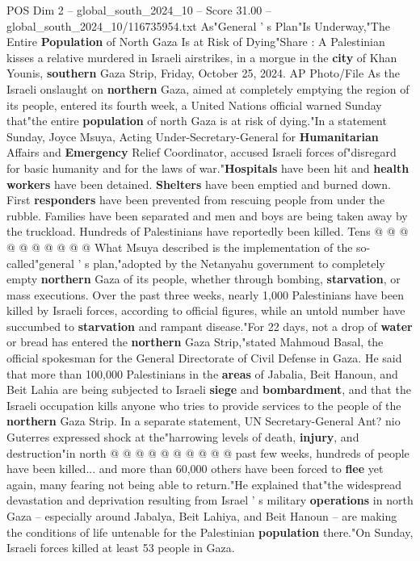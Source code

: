 \begin{textsample}{POS Dim 2 – global\_south\_2024\_10 – Score 31.00 – global\_south\_2024\_10/116735954.txt}  \label{ex:f2_pos_132}
As"General ' s Plan"Is Underway,"The Entire \textbf{Population} of North Gaza Is at Risk of Dying"Share : A Palestinian kisses a relative murdered in Israeli airstrikes, in a morgue in the \textbf{city} of Khan Younis, \textbf{southern} Gaza Strip, Friday, October 25, 2024.
AP Photo/File As the Israeli onslaught on \textbf{northern} Gaza, aimed at completely emptying the region of its people, entered its fourth week, a United Nations official warned Sunday that"the entire \textbf{population} of north Gaza is at risk of dying."In a statement Sunday, Joyce Msuya, Acting Under-Secretary-General for \textbf{Humanitarian} Affairs and \textbf{Emergency} Relief Coordinator, accused Israeli forces of"disregard for basic humanity and for the laws of war."\textbf{Hospitals} have been hit and \textbf{health} \textbf{workers} have been detained. \textbf{Shelters} have been emptied and burned down.
First \textbf{responders} have been prevented from rescuing people from under the rubble.
Families have been separated and men and boys are being taken away by the truckload.
Hundreds of Palestinians have reportedly been killed.
Tens @ @ @ @ @ @ @ @ @ @ What Msuya described is the implementation of the so-called"general ' s plan,"adopted by the Netanyahu government to completely empty \textbf{northern} Gaza of its people, whether through bombing, \textbf{starvation}, or mass executions.
Over the past three weeks, nearly 1,000 Palestinians have been killed by Israeli forces, according to official figures, while an untold number have succumbed to \textbf{starvation} and rampant disease."For 22 days, not a drop of \textbf{water} or bread has entered the \textbf{northern} Gaza Strip,"stated Mahmoud Basal, the official spokesman for the General Directorate of Civil Defense in Gaza.
He said that more than 100,000 Palestinians in the \textbf{areas} of Jabalia, Beit Hanoun, and Beit Lahia are being subjected to Israeli \textbf{siege} and \textbf{bombardment}, and that the Israeli occupation kills anyone who tries to provide services to the people of the \textbf{northern} Gaza Strip.
In a separate statement, UN Secretary-General Ant? nio Guterres expressed shock at the"harrowing levels of death, \textbf{injury}, and destruction"in north @ @ @ @ @ @ @ @ @ @ past few weeks, hundreds of people have been killed... and more than 60,000 others have been forced to \textbf{flee} yet again, many fearing not being able to return."He explained that"the widespread devastation and deprivation resulting from Israel ' s military \textbf{operations} in north Gaza -- especially around Jabalya, Beit Lahiya, and Beit Hanoun -- are making the conditions of life untenable for the Palestinian \textbf{population} there."On Sunday, Israeli forces killed at least 53 people in Gaza.

\end{textsample}
